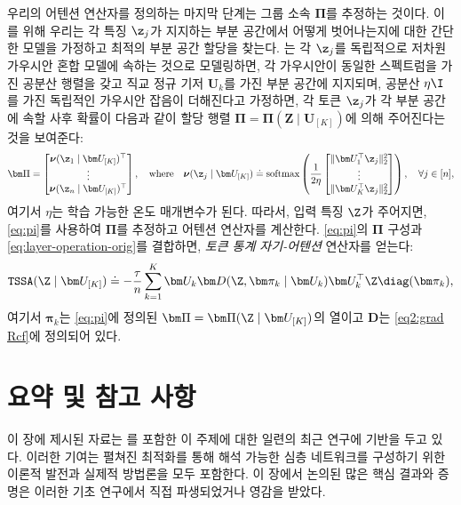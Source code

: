\documentclass[../../book-main_ko.tex]{subfiles}
\begin{document}
우리의 어텐션 연산자를 정의하는 마지막 단계는 그룹 소속 $\bm\Pi$를 추정하는 것이다. 이를 위해 우리는 각 특징 \(\z_{j}\)가 지지하는 부분 공간에서 어떻게 벗어나는지에 대한 간단한 모델을 가정하고 최적의 부분 공간 할당을 찾는다. \cite{yu2023white}는 각 \(\z_{j}\)를 독립적으로 저차원 가우시안 혼합 모델에 속하는 것으로 모델링하면, 각 가우시안이 동일한 스펙트럼을 가진 공분산 행렬을 갖고 직교 정규 기저 \(\bm U_{k}\)를 가진 부분 공간에 지지되며, 공분산 \(\eta \I\)를 가진 독립적인 가우시안 잡음이 더해진다고 가정하면, 각 토큰 \(\z_{j}\)가 각 부분 공간에 속할 사후 확률이 다음과 같이 할당 행렬 \(\bm \Pi = \bm \Pi(\bm Z \mid \bm U_{[K]})\)에 의해 주어진다는 것을 보여준다:
\begin{align}\label{eq:pi}
    \bm \Pi = \begin{bmatrix} \boldsymbol{\nu}(\z_1 \mid \bm U_{[K]})^\top \\ \vdots \\ \boldsymbol{\nu}(\z_n \mid \bm U_{[K]})^\top \end{bmatrix}, \quad
\text{where} \quad 
\boldsymbol{\nu}(\z_j \mid \bm U_{[K]}) \doteq \operatorname{softmax}\left( \frac{1}{2\eta} \begin{bmatrix} \|  \bm U_{1}^{\top} \z_j \|_2^2 \\ \vdots \\ \| \bm U_{K}^{\top} \z_j \|_2^2 \end{bmatrix} \right), \quad \forall j \in [n],
\end{align}
여기서 $\eta$는 학습 가능한 온도 매개변수가 된다. 따라서, 입력 특징 \(\Z\)가 주어지면, \eqref{eq:pi}를 사용하여 \(\bm\Pi\)를 추정하고 어텐션 연산자를 계산한다. \eqref{eq:pi}의 $\bm\Pi$ 구성과
\eqref{eq:layer-operation-orig}를 결합하면, {\em 토큰 통계 자기-어텐션} 연산자를 얻는다:
\begin{equation}
    \label{eq:tssa}
   \texttt{TSSA}(\Z \mid \bm U_{[K]}) \doteq -\frac{\tau}{n}\sum_{k = 1}^{K}\bm U_{k}\bm D(\Z, \bm\pi_{k} \mid \bm U_{k})\bm U_{k}^{\top}\Z\diag(\bm \pi_{k}),
\end{equation}
여기서 \(\bm\pi_{k}\)는 \eqref{eq:pi}에 정의된 \(\bm\Pi = \bm\Pi(\Z \mid \bm U_{[K]})\)의 열이고 \(\bm D\)는 \eqref{eq2:grad Rcf}에 정의되어 있다. 


\section{요약 및 참고 사항}

이 장에 제시된 자료는 \cite{chan2021redunet, wang2024global, wang2025attention, wu2025token, yu2023white}를 포함한 이 주제에 대한 일련의 최근 연구에 기반을 두고 있다. 이러한 기여는 펼쳐진 최적화를 통해 해석 가능한 심층 네트워크를 구성하기 위한 이론적 발전과 실제적 방법론을 모두 포함한다. 이 장에서 논의된 많은 핵심 결과와 증명은 이러한 기초 연구에서 직접 파생되었거나 영감을 받았다. 
\end{document}
